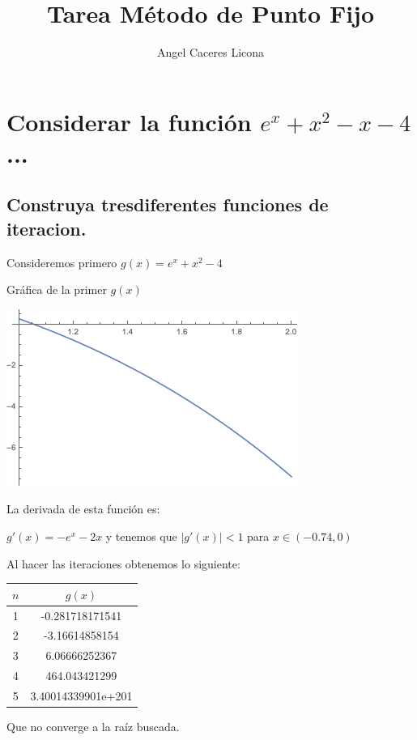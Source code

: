 \documentclass{article}
\begin{document}
\title{Tarea Método de Punto Fijo}
\author{Angel Caceres Licona}

\maketitle

\section{Considerar la función $e^x+x^2-x-4$...}
\subsection{Construya tresdiferentes funciones de iteracion.}
Consideremos primero $g(x)=e^x+x^2-4$

Gráfica de la primer $g(x)$

\includegraphics[scale=0.4]{grafica1ergx.png}

La derivada de esta función es:

$g'(x) = -e^x-2x$ 
y tenemos que
$|g'(x)| < 1$ para $x \in (-0.74, 0)$

Al hacer las iteraciones obtenemos lo siguiente:

\begin{center}
    \begin{tabular}{||c c||} 
    \hline
    $n$ & $g(x)$\\ [0.5ex] 
    \hline
    1 & -0.281718171541 \\
    \hline
    2 & -3.16614858154 \\
    \hline
    3 & 6.06666252367 \\
    \hline
    4 & 464.043421299 \\ 
    \hline
    5 & 3.40014339901e+201 \\ [1ex]
    \hline

   \end{tabular}
\end{center}
Que no converge a la raíz buscada.
\end{document}
